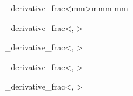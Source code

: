\NewTemplateCommand\tmpl_derivative_frac<mm>{mmm mm}{
}


%
%
%
%
%

\TemplateInstancePIE\od\tmpl_derivative_frac<\dif, \frac>

%
%
%
%

\TemplateInstancePIE\lod\tmpl_derivative_frac<\dif, \sfrac>

%
%
%
%

\TemplateInstancePIE\tod\tmpl_derivative_frac<\dif, \tfrac>

%
%
%
%

\TemplateInstancePIE\dod\tmpl_derivative_frac<\dif, \dfrac>

